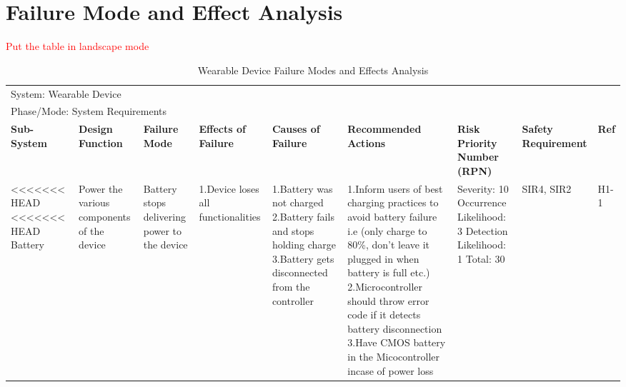 \documentclass[12pt, titlepage]{article}
\begin{document}
\section{Failure Mode and Effect Analysis}
\textcolor{red}{Put the table in landscape mode}

\begin{landscape}
\begin{table}[H]
\centering
    \caption{Wearable Device Failure Modes and Effects Analysis}
	
    \begin{tabular}{| p{} | p{}  | p{} | p{} | p{} | p{} | p{} | p{} | p{} |}
    \hline
    
    \multicolumn{9}{|l|}{System: Wearable Device} \\
    \multicolumn{9}{|l|}{Phase/Mode: System Requirements} \\ \hline
    \textbf{Sub-System} & \textbf{Design Function} & \textbf{Failure Mode} & \textbf{Effects of Failure} & \textbf{Causes of Failure} & \textbf{Recommended Actions} & \textbf{Risk Priority Number (RPN)} & \textbf{Safety Requirement} & \textbf{Ref} \\ \hline

<<<<<<< HEAD
<<<<<<< HEAD
    Battery & Power the various components of the device  & Battery stops delivering power to the device & 1.Device loses all functionalities & 1.Battery was not charged \newline 2.Battery fails and stops holding charge \newline 3.Battery gets disconnected from the controller & 1.Inform users of best charging practices to avoid battery failure i.e (only charge to 80\%, don't leave it plugged in when battery is full etc.) \newline 2.Microcontroller should throw error code if it detects battery disconnection \newline 3.Have CMOS battery in the Micocontroller incase of power loss & Severity: 10 \newline Occurrence Likelihood: 3 \newline Detection Likelihood: 1 \newline Total: 30 & SIR4, SIR2 & H1-1 \\ \cline{1-9}
    
    \end{tabular}

\end{table}
    

\end{landscape}
\end{document}
